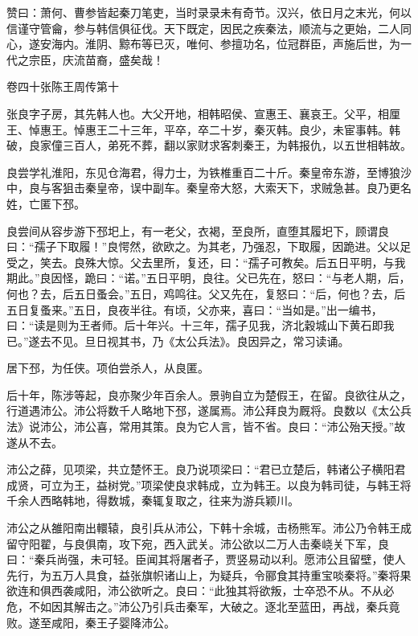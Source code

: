 \documentclass[12pt,UTF8]{ctexbook}
\begin{document}
赞曰：萧何、曹参皆起秦刀笔吏，当时录录未有奇节。汉兴，依日月之末光，何以信谨守管龠，参与韩信俱征伐。天下既定，因民之疾秦法，顺流与之更始，二人同心，遂安海内。淮阴、黥布等已灭，唯何、参擅功名，位冠群臣，声施后世，为一代之宗臣，庆流苗裔，盛矣哉！





卷四十张陈王周传第十



张良字子房，其先韩人也。大父开地，相韩昭侯、宣惠王、襄哀王。父平，相厘王、悼惠王。悼惠王二十三年，平卒，卒二十岁，秦灭韩。良少，未宦事韩。韩破，良家僮三百人，弟死不葬，翻以家财求客刺秦王，为韩报仇，以五世相韩故。



良尝学礼淮阳，东见仓海君，得力士，为铁椎重百二十斤。秦皇帝东游，至博狼沙中，良与客狙击秦皇帝，误中副车。秦皇帝大怒，大索天下，求贼急甚。良乃更名姓，亡匿下邳。



良尝间从容步游下邳圯上，有一老父，衣褐，至良所，直堕其履圯下，顾谓良曰：“孺子下取履！”良愕然，欲欧之。为其老，乃强忍，下取履，因跪进。父以足受之，笑去。良殊大惊。父去里所，复还，曰：“孺子可教矣。后五日平明，与我期此。”良因怪，跪曰：“诺。”五日平明，良往。父已先在，怒曰：“与老人期，后，何也？去，后五日蚤会。”五日，鸡鸣往。父又先在，复怒曰：“后，何也？去，后五日复蚤来。”五日，良夜半往。有顷，父亦来，喜曰：“当如是。”出一编书，曰：“读是则为王者师。后十年兴。十三年，孺子见我，济北穀城山下黄石即我已。”遂去不见。旦日视其书，乃《太公兵法》。良因异之，常习读诵。



居下邳，为任侠。项伯尝杀人，从良匿。



后十年，陈涉等起，良亦聚少年百余人。景驹自立为楚假王，在留。良欲往从之，行道遇沛公。沛公将数千人略地下邳，遂属焉。沛公拜良为厩将。良数以《太公兵法》说沛公，沛公喜，常用其策。良为它人言，皆不省。良曰：“沛公殆天授。”故遂从不去。



沛公之薛，见项梁，共立楚怀王。良乃说项梁曰：“君已立楚后，韩诸公子横阳君成贤，可立为王，益树党。”项梁使良求韩成，立为韩王。以良为韩司徒，与韩王将千余人西略韩地，得数城，秦辄复取之，往来为游兵颖川。



沛公之从雒阳南出轘辕，良引兵从沛公，下韩十余城，击杨熊军。沛公乃令韩王成留守阳翟，与良俱南，攻下宛，西入武关。沛公欲以二万人击秦峣关下军，良曰：“秦兵尚强，未可轻。臣闻其将屠者子，贾竖易动以利。愿沛公且留壁，使人先行，为五万人具食，益张旗帜诸山上，为疑兵，令郦食其持重宝啖秦将。”秦将果欲连和俱西袭咸阳，沛公欲听之。良曰：“此独其将欲叛，士卒恐不从。不从必危，不如因其解击之。”沛公乃引兵击秦军，大破之。逐北至蓝田，再战，秦兵竟败。遂至咸阳，秦王子婴降沛公。
\end{document}
